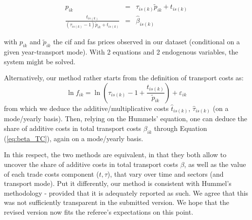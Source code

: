 \documentclass[a4paper,12pt]{article}
\begin{document}
\begin{itemize}
\begin{eqnarray}
p_{ik} &=& \tau_{is(k)}\widetilde{p}_{ik} +t_{is(k)} \label{eq:system1}\\
\frac{t_{is(k)}}{(\tau_{is(k)}-1)\widetilde{p}_{ik}+ t_{is(k)}} &=& \widehat{\beta}_{is(k)}  \label{eq:system2}
\end{eqnarray}

\noindent with $p_{ik}$ and $\widetilde{p}_{ik}$ the cif and fas prices observed in our dataset (conditional on a given year-transport mode). With 2 equations and 2 endogenous variables, the system might be solved.

     Alternatively, our method rather starts from the definition of transport costs as:
     $$\ln f_{ik} = \ln\left(\tau_{is(k)} -1 + \frac{t_{is(k)}}{\widetilde{p}_{ik}}\right) +\varepsilon_{ik}$$
from which we deduce the additive/multiplicative costs $\widehat{t}_{is(k)}$, $\widehat{\tau}_{is(k)}$ (on a mode/yearly basis). Then, relying on the Hummels' equation, one can deduce the share of additive costs in total transport costs $\beta_{ik}$ through Equation (\ref{eq:beta_TC}), again on a mode/yearly basis.

In this respect, the two methods are equivalent, in that they both allow to uncover the share of additive costs in total transport costs $\beta$, as well as the value of each trade costs component ($t,\tau$), that vary over time and sectors (and transport mode). Put it differently, our method is consistent with Hummel's methodology - provided that it is adequately reported as such. We agree that this was not sufficiently transparent in the submitted version. We hope that the revised version now fits the referee's expectations on this point.

\end{itemize}
\end{document}
